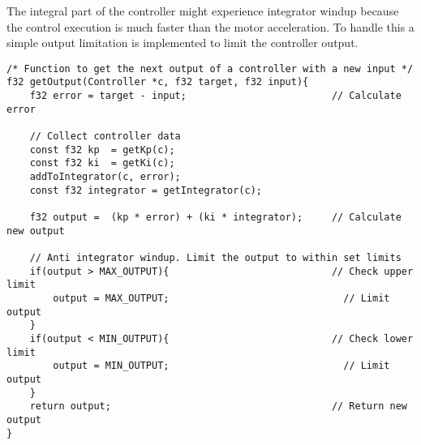 The integral part of the controller might experience integrator windup because the control execution is much faster than the motor acceleration. To handle this a simple output limitation is implemented to limit the controller output.



\begin{lstlisting}[style=c, caption=Implementation of PI-controller 'get output'-function., label=code:pi_controller3]
/* Function to get the next output of a controller with a new input */
f32 getOutput(Controller *c, f32 target, f32 input){
	f32 error = target - input;                         // Calculate error
	
	// Collect controller data
	const f32 kp  = getKp(c);
	const f32 ki  = getKi(c);
	addToIntegrator(c, error);
	const f32 integrator = getIntegrator(c);

	f32 output =  (kp * error) + (ki * integrator);     // Calculate new output
	
	// Anti integrator windup. Limit the output to within set limits
	if(output > MAX_OUTPUT){                            // Check upper limit
		output = MAX_OUTPUT;                              // Limit output
	}
	if(output < MIN_OUTPUT){                            // Check lower limit
		output = MIN_OUTPUT;                              // Limit output
	}	
	return output;                                      // Return new output
}
\end{lstlisting}

